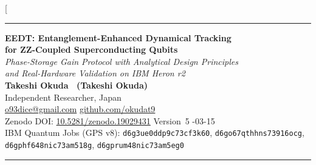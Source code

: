 \documentclass[10pt,twocolumn]{article}
\begin{document}
\twocolumn[{%
\begin{@twocolumnfalse}
\vspace*{-0.5em}
{\color{NatureGreen}\rule{\linewidth}{1.5pt}}
\vspace{0.4em}

\begin{center}
{\LARGE\bfseries\color{DarkGray}
  EEDT: Entanglement-Enhanced Dynamical Tracking\\[4pt]
  for ZZ-Coupled Superconducting Qubits}\\[6pt]
{\large\itshape
  Phase-Storage Gain Protocol with Analytical Design Principles\\
  and Real-Hardware Validation on IBM Heron r2}\\[10pt]
{\normalsize\bfseries
  Takeshi Okuda
  \ (Takeshi Okuda)}\\[2pt]
{\small Independent Researcher, Japan}\\[2pt]
{\small \href{mailto:o93dice@gmail.com}{o93dice@gmail.com} \quad
        \href{https://github.com/okudat9}{github.com/okudat9}}\\[4pt]
{\small Zenodo DOI: \href{https://doi.org/10.5281/zenodo.19029431}%
  {10.5281/zenodo.19029431} \quad Version~5 -03-15}\\[4pt]
{\small\color{DarkGray}
  IBM Quantum Jobs (GPS v8):
  \texttt{d6g3ue0ddp9c73cf3k60},
  \texttt{d6go67qthhns73916ocg},
  \texttt{d6gphf648nic73am518g},
  \texttt{d6gprum48nic73am5eg0}}
\end{center}

\vspace{0.6em}
{\color{NatureGreen}\rule{\linewidth}{0.5pt}}
\vspace{0.8em}


\end{@twocolumnfalse}}
\end{document}
